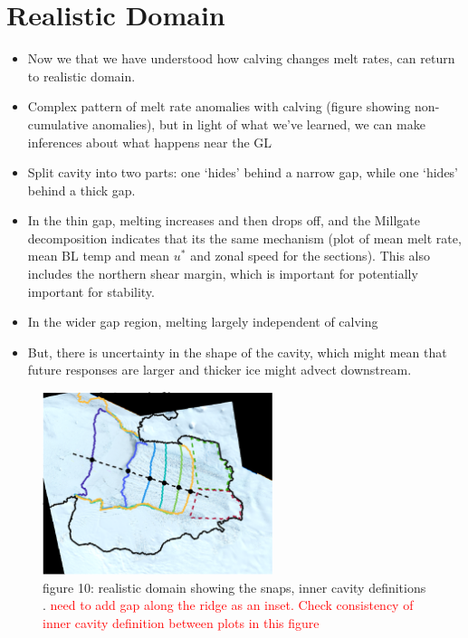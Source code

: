 \documentclass[draft]{agujournal2019}
\newcommand{\red}[1]{\textcolor{red}{#1}}
\begin{document}
\section{Realistic Domain}
\begin{itemize}
    \item Now we that we have understood how calving changes melt rates, can return to realistic domain.
    \item Complex pattern of melt rate anomalies with calving (figure showing non-cumulative anomalies), but in light of what we've learned, we can make inferences about what happens near the GL
    \item Split cavity into two parts: one `hides' behind a narrow gap, while one `hides' behind a thick gap. 
    \item In the thin gap, melting increases and then drops off, and the Millgate decomposition indicates that its the same mechanism (plot of mean melt rate, mean BL temp and mean $u^*$ and zonal speed for the sections). This also includes the northern shear margin, which is important for potentially important for stability.
    \item In the wider gap region, melting largely independent of calving 
    \item But, there is uncertainty in the shape of the cavity, which might mean that future responses are larger and thicker ice might advect downstream. 
\end{itemize}
\begin{figure}
    \centering
    \includegraphics[width = 0.6\textwidth]{../make_figures/plots/figure10.eps}
    \caption{figure 10: realistic domain showing the snaps, inner cavity definitions . \red{need to add gap along the ridge as an inset. Check consistency of inner cavity definition between plots in this figure}}
    \label{fig:my_label}
\end{figure}
\end{document}
